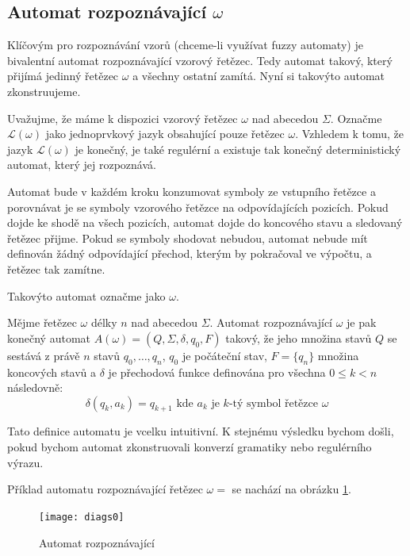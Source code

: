 \documentclass[a4paper,10pt]{article}
\begin{document}
\subsection{Automat rozpoznávající $\omega$}
Klíčovým pro rozpoznávání vzorů (chceme-li využívat fuzzy automaty) je bivalentní automat rozpoznávající vzorový řetězec. Tedy automat takový, který přijímá jedinný řetězec $\omega$ a všechny ostatní zamítá. Nyní si takovýto automat zkonstruujeme.

Uvažujme, že máme k dispozici vzorový řetězec $\omega$ nad abecedou $\Sigma$. Označme $\mathcal{L}(\omega)$ jako jednoprvkový jazyk obsahující pouze řetězec $\omega$. Vzhledem k tomu, že jazyk $\mathcal{L}(\omega)$ je konečný, je také regulérní a existuje tak konečný deterministický automat, který jej rozpoznává.

Automat bude v každém kroku konzumovat symboly ze vstupního řetězce a porovnávat je se symboly vzorového řetězce na odpovídajících pozicích. Pokud dojde ke shodě na všech pozicích, automat dojde do koncového stavu a sledovaný řetězec přijme. Pokud se symboly shodovat nebudou, automat nebude mít definován žádný odpovídající přechod, kterým by pokračoval ve výpočtu, a řetězec tak zamítne. 

Takovýto automat označme jako  $\omega$.
\begin{definition}
  Mějme řetězec $\omega$ délky $n$ nad abecedou $\Sigma$. Automat rozpoznávající $\omega$ je pak konečný automat $A(\omega) = ( Q, \Sigma, \delta, q_0, F )$ takový, že jeho množina stavů $Q$ se sestává z právě $n$ stavů $q_0, \dots, q_n$, $q_0$ je počáteční stav, $F = \{ q_n \}$ množina koncových stavů a $\delta$ je přechodová funkce definována pro všechna $0 \leq k < n$ následovně:
  $$
    \delta(q_{k}, a_k) = q_{k+1} \text{ kde $a_k$ je $k$-tý symbol řetězce $\omega$}
  $$
\end{definition}

Tato definice automatu je vcelku intuitivní. K stejnému výsledku bychom došli, pokud bychom automat zkonstruovali konverzí gramatiky nebo regulérního výrazu. 

\begin{example}
 Příklad automatu rozpoznávající řetězec $\omega = $  se nachází na obrázku \ref{diag-AutRozpHell}.  

  \begin{figure}
    \texttt{[image: diags0]}
    \caption{Automat rozpoznávající } \label{diag-AutRozpHell}
  \end{figure}
\end{example}
\end{document}
